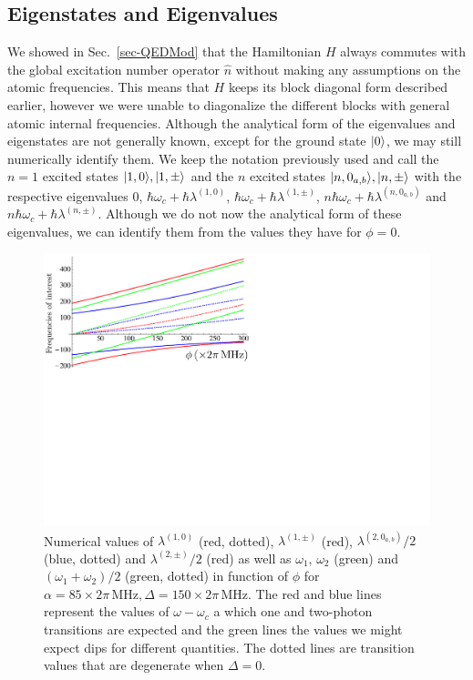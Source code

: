 \subsection{Eigenstates and Eigenvalues}

We showed in Sec.~\ref{sec-QEDMod} that the Hamiltonian $H$ always commutes with the global excitation number operator $\hat n$ without making any assumptions on the atomic frequencies. This means that $H$ keeps its block diagonal form described earlier, however we were unable to diagonalize the different blocks with general atomic internal frequencies. Although the analytical form of the eigenvalues and eigenstates are not generally known, except for the ground state $| 0 \rangle$, we may still numerically identify them. We keep the notation previously used and call the $n=1$ excited states $| 1,0 \rangle, | 1,\pm \rangle$ and the $n$ excited states $| n,0_{a,b} \rangle, | n,\pm \rangle$ with the respective eigenvalues 0, $\hbar\omega_c+\hbar\lambda^{(1,0)}$, $\hbar\omega_c+\hbar\lambda^{(1,\pm)}$, $n\hbar \omega_c+\hbar\lambda^{(n,0_{a,b})}$ and $n\hbar \omega_c+\hbar\lambda^{(n,\pm)}$. Although we do not now the analytical form of these eigenvalues, we can identify them from the values they have for $\phi=0$.

\begin{figure}
    \center
    \includegraphics[width=0.75 \textwidth]{Images/chap5/transitions.pdf}
    \caption[Numerical values of $\lambda^{(1,0)}$]{Numerical values of $\lambda^{(1,0)}$ (red, dotted), $\lambda^{(1,\pm)}$ (red), $\lambda^{(2,0_{a,b})}/2$ (blue, dotted) and $\lambda^{(2,\pm)}/2$ (red) as well as $\omega_1$, $\omega_2$ (green) and $(\omega_1+\omega_2)/2$ (green, dotted) in function of $\phi$ for $\alpha = 85\times 2\pi\,\mbox{MHz}, \Delta = 150 \times 2\pi\,\mbox{MHz}$. The red and blue lines represent the values of $\omega-\omega_c$ a which one and two-photon transitions are expected and the green lines the values we might expect dips for different quantities. The dotted lines are  transition values that are degenerate when $\Delta=0$.}
    \label{fig-trans}
\end{figure}

